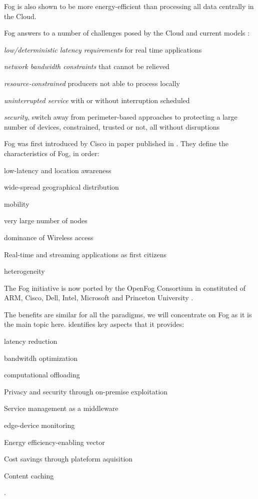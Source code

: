 \documentclass[11pt]{sdm}
\begin{document}
\begin{description}
	Fog is also shown to be more energy-efficient than processing all data centrally in the Cloud.
	
	Fog answers to a number of challenges posed by the Cloud and current models \cite{chiang_fog_2016}: 
	\begin{enumerate*}[(a)]
		\item \emph{low/deterministic latency requirements} for real time applications
		\item \emph{network bandwidth constraints} that cannot be relieved
		\item \emph{resource-constrained} producers not able to process locally
		\item \emph{uninterrupted service} with or without interruption scheduled
		\item \emph{security}, switch away from perimeter-based approaches to protecting a large number of devices, constrained, trusted or not, all without disruptions
	\end{enumerate*}
	
	Fog was first introduced by Cisco in  paper published in . They define the characteristics of Fog, in order:
	\begin{enumerate*}[(i)]
		\item low-latency and location awareness
		\item wide-spread geographical distribution
		\item mobility
		\item very large number of nodes
		\item dominance of Wireless access
		\item Real-time and streaming applications as first citizens
		\item heterogeneity
	\end{enumerate*}
	The Fog initiative is now ported by the OpenFog Consortium in  \cite{ieee_standards_association_ieee_2018} constituted of ARM, Cisco, Dell, Intel, Microsoft and Princeton University \cite{chiang_fog_2016}.
\end{description}

The benefits are similar for all the paradigms, we will concentrate on Fog as it is the main topic here. \citet{ahmed_fog_2019} identifies key aspects that it provides:
\begin{enumerate*}[(a)]
	\item latency reduction
	\item bandwitdh optimization
	\item computational offloading
	\item Privacy and security through on-premise exploitation
	\item Service management as a middleware
	\item edge-device monitoring
	\item Energy efficiency-enabling vector
	\item Cost savings through plateform aquisition
	\item Content caching
\end{enumerate*}.
\end{document}
